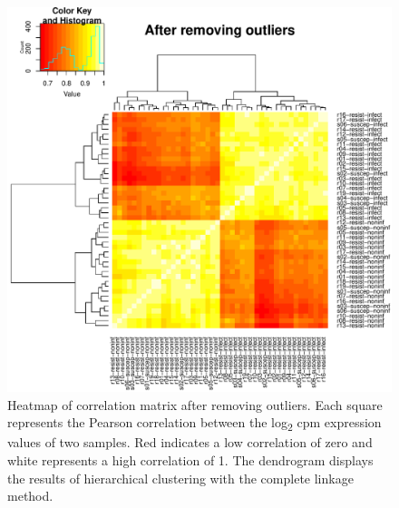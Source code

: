 \documentclass[fleqn,10pt]{wlscirep}
\begin{document}
\begin{figure}[ht]
\centering
\includegraphics[width=\linewidth]{../figure/heatmap-no-outliers.pdf}
\caption{
Heatmap of correlation matrix after removing outliers. Each square
represents the Pearson correlation between the log\textsubscript{2}
cpm expression values of two samples. Red indicates a low correlation
of zero and white represents a high correlation of 1. The dendrogram
displays the results of hierarchical clustering with the complete
linkage method.
}
\label{fig:heat-filt}
\end{figure}
\end{document}
